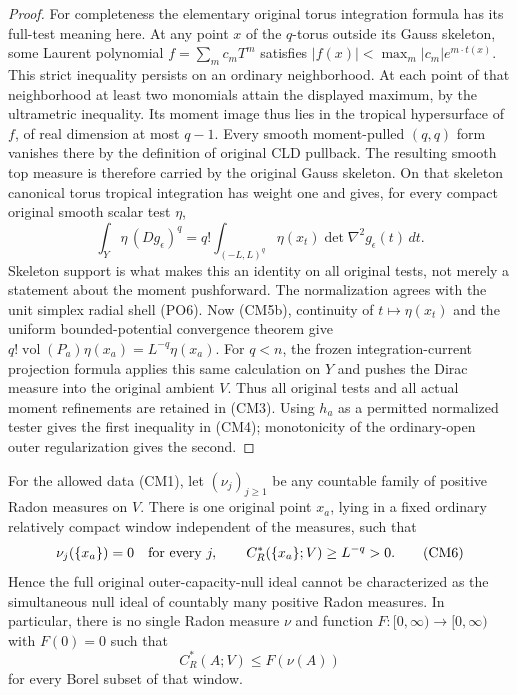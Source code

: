 \begin{proof}
For completeness the elementary original torus integration formula
has its full-test meaning here. At any point $x$ of the $q$-torus
outside its Gauss skeleton, some Laurent polynomial $f=\sum_m c_mT^m$
satisfies
$|f(x)|<\max_m |c_m|e^{m\cdot t(x)}$. This strict inequality persists
on an ordinary neighborhood. At each point of that neighborhood at
least two monomials attain the displayed maximum, by the ultrametric
inequality. Its moment image thus lies in the tropical hypersurface
of $f$, of real dimension at most $q-1$. Every smooth moment-pulled
$(q,q)$ form vanishes there by the definition of original CLD pullback.
The resulting smooth top measure is therefore carried by the original
Gauss skeleton. On that skeleton canonical torus tropical integration
has weight one and gives, for every compact original smooth scalar
test $\eta$,
\[
  \int_Y \eta\,(Dg_\epsilon)^q
       =q!\int_{(-L,L)^q}\eta(x_t)
                          \det\nabla^2g_\epsilon(t)\,dt.
 \tag{CM5c}
\]
Skeleton support is what makes this an identity on all original
tests, not merely a statement about the moment pushforward.
The normalization agrees with the unit simplex radial shell (PO6).
Now (CM5b), continuity of $t\mapsto\eta(x_t)$ and the uniform
bounded-potential convergence theorem give
$q!\operatorname{vol}(P_a)\eta(x_a)=L^{-q}\eta(x_a)$.
For $q<n$, the frozen integration-current projection formula applies
this same calculation on $Y$ and pushes the Dirac measure into the
original ambient $V$. Thus all original tests and all actual
moment refinements are retained in (CM3).
Using $h_a$ as a permitted normalized tester gives the first
inequality in (CM4); monotonicity of the ordinary-open outer
regularization gives the second.
\end{proof}

\begin{theorem}
\label{thm:r12-no-countable-radon-capacity-control}
For the allowed data (CM1), let $(\nu_j)_{j\geq1}$ be any countable
family of positive Radon measures on $V$. There is one original
point $x_a$, lying in a fixed ordinary relatively compact window
independent of the measures, such that
\[
            \nu_j(\{x_a\})=0\quad\hbox{for every }j,
                  \qquad C_R^*(\{x_a\};V)\geq L^{-q}>0.
 \tag{CM6}
\]
Hence the full original outer-capacity-null ideal cannot be
characterized as the simultaneous null ideal of countably many
positive Radon measures. In particular, there is no single Radon
measure $\nu$ and function $F:[0,\infty)\to[0,\infty)$ with
$F(0)=0$ such that
\[
                         C_R^*(A;V)\leq F(\nu(A))
 \tag{CM7}
\]
for every Borel subset of that window.
\end{theorem}

